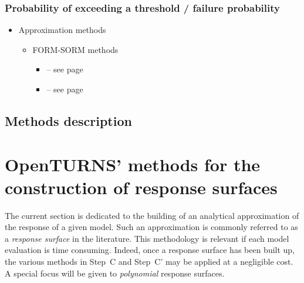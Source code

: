 \subsubsection{Probability of exceeding a threshold / failure probability}

\begin{itemize}

\item Approximation methods
\begin{itemize}
\item FORM-SORM methods
\begin{itemize}
\item {}  -- see page \pageref{docref_Cprime31_ImportanceFactor} \vspace{2mm}
\item {}  -- see page \pageref{docref_Cprime31_SensitivityFactor} \vspace{2mm}
\end{itemize}
\end{itemize}

\end{itemize}

\newpage

\subsection{Methods description}


\newpage

\newpage

\newpage

\newpage

\newpage

\newpage

\newpage

\newpage

\newpage

\newpage

\newpage

\section{OpenTURNS' methods for the construction of response surfaces}

The current section is dedicated to the building of an analytical approximation of the response of a given model. Such an approximation is commonly referred to as a \emph{response surface} in the literature. This methodology is relevant if each model evaluation is time consuming. Indeed, once a response surface has been built up, the various methods in Step~C and Step~C' may be applied at a negligible cost. A special focus will be given to \emph{polynomial} response surfaces.

